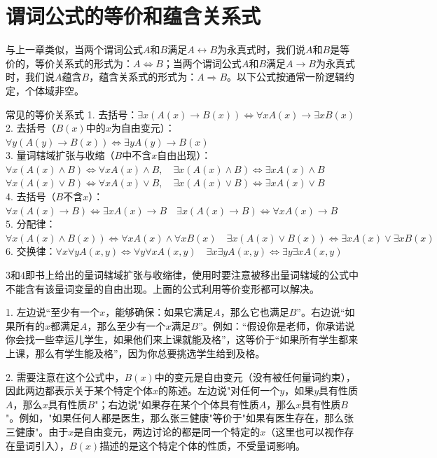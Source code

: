 \documentclass[lang=cn,11pt]{elegantbook}
\begin{document}
\section{谓词公式的等价和蕴含关系式}
与上一章类似，当两个谓词公式$A$和$B$满足$A\leftrightarrow B$为永真式时，我们说$A$和$B$是等价的，等价关系式的形式为：$A\Leftrightarrow B$；当两个谓词公式$A$和$B$满足$A\rightarrow B$为永真式时，我们说$A$蕴含$B$，蕴含关系式的形式为：$A\Rightarrow B$。以下公式按通常一阶逻辑约定，个体域非空。
\begin{theorem}{常见的等价关系式}
1. 去括号：$\exists x(A(x)\to B(x))\Leftrightarrow \forall xA(x)\to \exists xB(x)$\\
2. 去括号（$B(x)$中的$x$为自由变元）：$\forall y(A(y)\to B(x))\Leftrightarrow \exists yA(y)\to B(x)$\\
3. 量词辖域扩张与收缩（$B$中不含$x$自由出现）：\\
$\forall x(A(x)\land B)\Leftrightarrow \forall xA(x)\land B,\quad \exists x(A(x)\land B)\Leftrightarrow \exists xA(x)\land B$\\
$\forall x(A(x)\lor B)\Leftrightarrow \forall xA(x)\lor B,\quad \exists x(A(x)\lor B)\Leftrightarrow \exists xA(x)\lor B$\\
4. 去括号（$B$不含$x$）：$\forall x(A(x)\to B)\Leftrightarrow \exists xA(x)\to B\quad  \exists x(A(x)\to B)\Leftrightarrow \forall xA(x)\to B$\\
5. 分配律：$\forall x(A(x)\land B(x))\Leftrightarrow \forall xA(x)\land \forall xB(x)\quad \exists x(A(x)\lor B(x))\Leftrightarrow \exists xA(x)\lor \exists xB(x)$\\
6. 交换律：$\forall x\forall y A(x,y)\Leftrightarrow \forall y\forall x A(x,y)\quad \exists x\exists y A(x,y)\Leftrightarrow \exists y\exists x A(x,y)$
\end{theorem}
3和4即书上给出的量词辖域扩张与收缩律，使用时要注意被移出量词辖域的公式中不能含有该量词变量的自由出现。上面的公式利用等价变形都可以解决。

1. 左边说“至少有一个$x$，能够确保：如果它满足$A$，那么它也满足$B$”。右边说“如果所有的$x$都满足$A$，那么至少有一个$x$满足$B$”。例如：“假设你是老师，你承诺说你会找一些幸运儿学生，如果他们来上课就能及格”，这等价于“如果所有学生都来上课，那么有学生能及格”，因为你总要挑选学生给到及格。

2. 需要注意在这个公式中，$B(x)$中的变元是自由变元（没有被任何量词约束），因此两边都表示关于某个特定个体$x$的陈述。左边说"对任何一个$y$，如果$y$具有性质$A$，那么$x$具有性质$B$"；右边说"如果存在某个个体具有性质$A$，那么$x$具有性质$B$"。例如，"如果任何人都是医生，那么张三健康"等价于"如果有医生存在，那么张三健康"。由于$x$是自由变元，两边讨论的都是同一个特定的$x$（这里也可以视作存在量词引入），$B(x)$描述的是这个特定个体的性质，不受量词影响。
\end{document}
